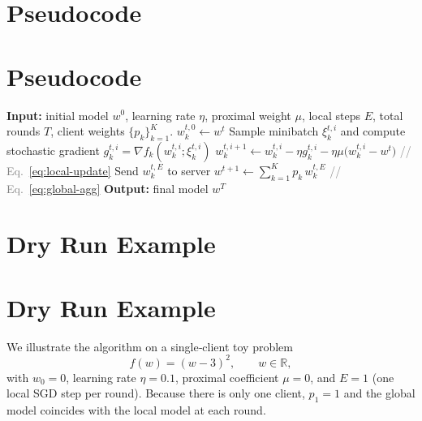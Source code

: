 \documentclass{article}
\newcommand{\R}{\mathbb{R}}
\begin{document}
\section*{Pseudocode}
\section{Pseudocode}
\begin{algorithm}[H]
\caption{FedProx with Local SGD}
\begin{algorithmic}[1]
\STATE \textbf{Input:} initial model $w^{0}$, learning rate $\eta$, proximal weight $\mu$, local steps $E$, total rounds $T$, client weights $\{p_k\}_{k=1}^{K}$.
        \STATE $w_{k}^{t,0}\gets w^{t}$
            \STATE Sample minibatch $\xi_{k}^{t,i}$ and compute stochastic gradient $g_{k}^{t,i}=\nabla f_k(w_{k}^{t,i};\xi_{k}^{t,i})$
            \STATE $w_{k}^{t,i+1}\gets w_{k}^{t,i}-\eta g_{k}^{t,i}-\eta\mu\bigl(w_{k}^{t,i}-w^{t}\bigr)$ \hfill \textcolor{gray}{// Eq.~\eqref{eq:local-update}}
        \ENDFOR
        \STATE Send $w_{k}^{t,E}$ to server
    \ENDFOR
    \STATE $w^{t+1}\gets\sum_{k=1}^{K}p_k\,w_{k}^{t,E}$ \hfill \textcolor{gray}{// Eq.~\eqref{eq:global-agg}}
\ENDFOR
\STATE \textbf{Output:} final model $w^{T}$
\end{algorithmic}
\end{algorithm}

\section*{Dry Run Example}
\section{Dry Run Example}
We illustrate the algorithm on a single‑client toy problem
\[
f(w)=(w-3)^{2},\qquad w\in\R,
\]
with $w_{0}=0$, learning rate $\eta=0.1$, proximal coefficient $\mu=0$,
and $E=1$ (one local SGD step per round).  Because there is only one client,
$p_{1}=1$ and the global model coincides with the local model at each round.
\end{document}
